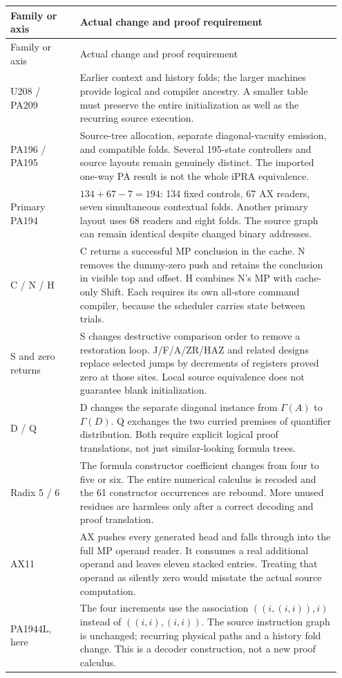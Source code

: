 \documentclass[10pt,letterpaper]{article}
\begin{document}
\begin{longtable}{@{}p{0.20\linewidth}p{0.75\linewidth}@{}}
\toprule Family or axis & Actual change and proof requirement\\\midrule\endfirsthead
\toprule Family or axis & Actual change and proof requirement\\\midrule\endhead
U208 / PA209 & Earlier context and history folds; the larger machines
provide logical and compiler ancestry. A smaller table must preserve
the entire initialization as well as the recurring source execution.\\[4pt]
PA196 / PA195 & Source-tree allocation, separate diagonal-vacuity
emission, and compatible folds. Several 195-state controllers and
source layouts remain genuinely distinct. The imported one-way PA
result is not the whole iPRA equivalence.\\[4pt]
Primary PA194 & $134+67-7=194$: 134 fixed controls, 67 AX readers, seven
simultaneous contextual folds. Another primary layout uses 68 readers
and eight folds. The source graph can remain identical despite changed
binary addresses.\\[4pt]
C / N / H & C returns a successful MP conclusion in the cache. N removes
the dummy-zero push and retains the conclusion in visible top and offset.
H combines N's MP with cache-only Shift. Each requires its own all-store
command compiler, because the scheduler carries state between trials.\\[4pt]
S and zero returns & S changes destructive comparison order to remove a
restoration loop. J/F/A/ZR/HAZ and related designs replace selected jumps
by decrements of registers proved zero at those sites. Local source
equivalence does not guarantee blank initialization.\\[4pt]
D / Q & D changes the separate diagonal instance from $\Gamma(A)$ to
$\Gamma(D)$. Q exchanges the two curried premises of quantifier
distribution. Both require explicit logical proof translations, not just
similar-looking formula trees.\\[4pt]
Radix 5 / 6 & The formula constructor coefficient changes from four to
five or six. The entire numerical calculus is recoded and the 61
constructor occurrences are rebound. More unused residues are harmless
only after a correct decoding and proof translation.\\[4pt]
AX11 & AX pushes every generated head and falls through into the full
MP operand reader. It consumes a real additional operand and leaves
eleven stacked entries. Treating that operand as silently zero would
misstate the actual source computation.\\[4pt]
PA1944L, here & The four increments use the association
$((i,(i,i)),i)$ instead of $((i,i),(i,i))$. The source instruction graph
is unchanged; recurring physical paths and a history fold change.
This is a decoder construction, not a new proof calculus.\\
\bottomrule
\end{longtable}
\end{document}
